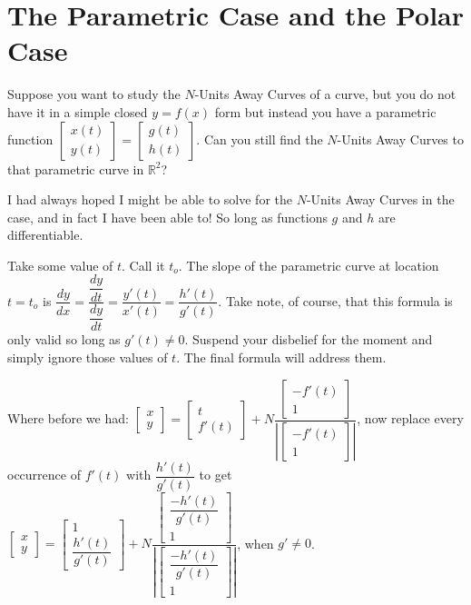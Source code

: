 \newcommand{\finalFormula}{


}

\section{The Parametric Case and the Polar Case}

Suppose you want to study the $N$-Units Away Curves of a curve, but you do not have it in a simple closed $y = f(x)$ form but instead you have a parametric function $\begin{bmatrix} x(t) \\ y(t) \end{bmatrix} = \begin{bmatrix} g(t) \\ h(t) \end{bmatrix}$. Can you still find the $N$-Units Away Curves to that parametric curve in $\mathbb{R}^2$?

I had always hoped I might be able to solve for the $N$-Units Away Curves in the case, and in fact I have been able to! So long as functions $g$ and $h$ are differentiable.

Take some value of $t$. Call it $t_o$. The slope of the parametric curve at location $t = t_o$ is $ \dfrac{dy}{dx} = 
\dfrac{\dfrac{dy}{dt}}{\dfrac{dy}{dt}} = \dfrac{y'(t)}{x'(t)} = \dfrac{h'(t)}{g'(t)} $. Take note, of course, that this formula is only valid so long as $g'(t) \neq 0$. Suspend your disbelief for the moment and simply ignore those values of $t$. The final formula will address them.
    
Where before we had: $\begin{bmatrix} x \\ y \end{bmatrix} = \begin{bmatrix} t \\ f'(t) \end{bmatrix} + N \dfrac{\begin{bmatrix} -f'(t) \\ 1 \end{bmatrix}}{|\begin{bmatrix} -f'(t) \\ 1 \end{bmatrix}|}$, now replace every occurrence of $f'(t)$ with $\dfrac{h'(t)}{g'(t)}$ to get $\begin{bmatrix} x \\ y \end{bmatrix} = \begin{bmatrix} 1 \\ \dfrac{h'(t)}{g'(t)} \end{bmatrix} + N \dfrac{\begin{bmatrix} \dfrac{-h'(t)}{g'(t)} \\ 1 \end{bmatrix}}{\left| \begin{bmatrix} \dfrac{-h'(t)}{g'(t)} \\ 1 \end{bmatrix} \right|}$, when $g' \neq 0$.

